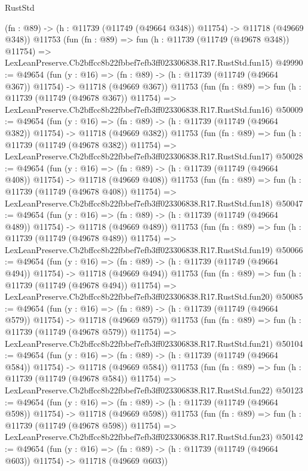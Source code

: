 \begin{lexlean}{RustStd}
\begin{coremodule}
    (fn : @89) -> (h : @11739 (@11749 (@49664 @348)) @11754) -> @11718 (@49669 @348))
    @11753
    (fun (fn : @89) =>
    fun (h : @11739 (@11749 (@49678 @348)) @11754) =>
    LexLeanPreserve.Cb2bffcc8b22fbbef7efb3ff023306838.R17.RustStd.fun15)
@49990 := @49654
    (fun (y : @16) =>
    (fn : @89) -> (h : @11739 (@11749 (@49664 @367)) @11754) -> @11718 (@49669 @367))
    @11753
    (fun (fn : @89) =>
    fun (h : @11739 (@11749 (@49678 @367)) @11754) =>
    LexLeanPreserve.Cb2bffcc8b22fbbef7efb3ff023306838.R17.RustStd.fun16)
@50009 := @49654
    (fun (y : @16) =>
    (fn : @89) -> (h : @11739 (@11749 (@49664 @382)) @11754) -> @11718 (@49669 @382))
    @11753
    (fun (fn : @89) =>
    fun (h : @11739 (@11749 (@49678 @382)) @11754) =>
    LexLeanPreserve.Cb2bffcc8b22fbbef7efb3ff023306838.R17.RustStd.fun17)
@50028 := @49654
    (fun (y : @16) =>
    (fn : @89) -> (h : @11739 (@11749 (@49664 @408)) @11754) -> @11718 (@49669 @408))
    @11753
    (fun (fn : @89) =>
    fun (h : @11739 (@11749 (@49678 @408)) @11754) =>
    LexLeanPreserve.Cb2bffcc8b22fbbef7efb3ff023306838.R17.RustStd.fun18)
@50047 := @49654
    (fun (y : @16) =>
    (fn : @89) -> (h : @11739 (@11749 (@49664 @489)) @11754) -> @11718 (@49669 @489))
    @11753
    (fun (fn : @89) =>
    fun (h : @11739 (@11749 (@49678 @489)) @11754) =>
    LexLeanPreserve.Cb2bffcc8b22fbbef7efb3ff023306838.R17.RustStd.fun19)
@50066 := @49654
    (fun (y : @16) =>
    (fn : @89) -> (h : @11739 (@11749 (@49664 @494)) @11754) -> @11718 (@49669 @494))
    @11753
    (fun (fn : @89) =>
    fun (h : @11739 (@11749 (@49678 @494)) @11754) =>
    LexLeanPreserve.Cb2bffcc8b22fbbef7efb3ff023306838.R17.RustStd.fun20)
@50085 := @49654
    (fun (y : @16) =>
    (fn : @89) -> (h : @11739 (@11749 (@49664 @579)) @11754) -> @11718 (@49669 @579))
    @11753
    (fun (fn : @89) =>
    fun (h : @11739 (@11749 (@49678 @579)) @11754) =>
    LexLeanPreserve.Cb2bffcc8b22fbbef7efb3ff023306838.R17.RustStd.fun21)
@50104 := @49654
    (fun (y : @16) =>
    (fn : @89) -> (h : @11739 (@11749 (@49664 @584)) @11754) -> @11718 (@49669 @584))
    @11753
    (fun (fn : @89) =>
    fun (h : @11739 (@11749 (@49678 @584)) @11754) =>
    LexLeanPreserve.Cb2bffcc8b22fbbef7efb3ff023306838.R17.RustStd.fun22)
@50123 := @49654
    (fun (y : @16) =>
    (fn : @89) -> (h : @11739 (@11749 (@49664 @598)) @11754) -> @11718 (@49669 @598))
    @11753
    (fun (fn : @89) =>
    fun (h : @11739 (@11749 (@49678 @598)) @11754) =>
    LexLeanPreserve.Cb2bffcc8b22fbbef7efb3ff023306838.R17.RustStd.fun23)
@50142 := @49654
    (fun (y : @16) =>
    (fn : @89) -> (h : @11739 (@11749 (@49664 @603)) @11754) -> @11718 (@49669 @603))

\end{coremodule}
\end{lexlean}
